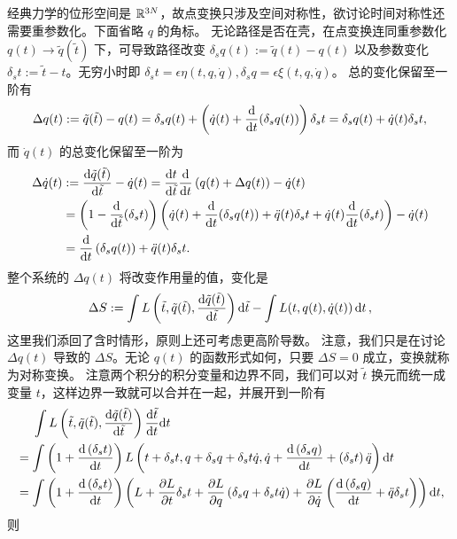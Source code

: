 经典力学的位形空间是 $\mathbb{R}^{3N}$，故点变换只涉及空间对称性，欲讨论时间对称性还需要重参数化。下面省略 $q$ 的角标。
无论路径是否在壳，在点变换连同重参数化 $q(t)\to\tilde q(\tilde t)$ 下，可导致路径改变 $\delta_s q(t):=\tilde q(t)-q(t)$ 以及参数变化 $\delta_s t:=\tilde t-t$。无穷小时即 $\delta_s t  =\epsilon \eta(t, q, \dot{q}), 
\delta_s q =\epsilon \xi(t, q, \dot{q})$。
总的变化保留至一阶有
\[\Delta q(t):=\tilde q(\tilde t)- q(t)=\delta_s q(t)+\left(\dot{q}(t)+\dv{t}(\delta_s  q(t))\right) \delta_s t=\delta_s q(t)+\dot{q}(t) \delta_s t,\]
而 $\dot q(t)$ 的总变化保留至一阶为
\begin{align*}
    \Delta\dot q(t)&:=\dv{\tilde q(\tilde t)}{\tilde t}-\dot q(t)=\dv{t}{\tilde t}\dv{t}\left(q(t)+\Delta q(t)\right)-\dot q(t)\\
    &=\left(1-\dv{\tilde t}(\delta_s t)\right)\left(\dot q(t)+\dv{t}(\delta_s  q(t))+\ddot{q}(t) \delta_s t+\dot q(t)\dv{t}(\delta_s t)\right)-\dot q(t)\\
    &=\dv{t}\left(\delta_{s} q(t)\right)+ \ddot{q}(t)\delta_{s} t.
\end{align*}
整个系统的 $\Delta q(t)$ 将改变作用量的值，变化是
\[\Delta S:=\int L\left(\tilde t,\tilde q(\tilde t),\dv{\tilde q(\tilde t)}{\tilde t}\right)\dd{\tilde t}-\int L(t,q(t),\dot{q}(t)) \dd{t},\]
这里我们添回了含时情形，原则上还可考虑更高阶导数。
注意，我们只是在讨论 $\Delta q(t)$ 导致的 $\Delta S$。无论 $q(t)$ 的函数形式如何，只要 $\Delta S=0$ 成立，变换就称为对称变换。
注意两个积分的积分变量和边界不同，我们可以对 $\tilde t$ 换元而统一成变量 $t$，这样边界一致就可以合并在一起，并展开到一阶有
\begin{align*} &\quad~\int  L\left(\tilde{t}, \tilde{q}(\tilde{t}), \frac{\mathrm{d} \tilde{q}(\tilde{t})}{\mathrm{d} \tilde{t}}\right) \frac{\mathrm{d} \tilde{t}}{\mathrm{d} t} \dd t\\ & =\int \left(1+\frac{\mathrm{d}\left(\delta_s t\right)}{\mathrm{d} t}\right) L\left(t+\delta_s t, q+\delta_s q+\delta_s t \dot{q}, \dot{q}+\frac{\mathrm{d}\left(\delta_s q\right)}{\mathrm{d} t}+\left(\delta_s t\right) \ddot{q}\right) \dd t  \\ & =\int \left(1+\frac{\mathrm{d}\left(\delta_s t\right)}{\mathrm{d} t}\right)\left(L+\frac{\partial L}{\partial t} \delta_s t+\frac{\partial L}{\partial q}\left(\delta_s q+\delta_s t \dot{q}\right)+\frac{\partial L}{\partial \dot{q}}\left(\frac{\mathrm{d}\left(\delta_s q\right)}{\mathrm{d} t}+\ddot{q}\delta_s t  \right)\right)\dd t,
\end{align*}
则
